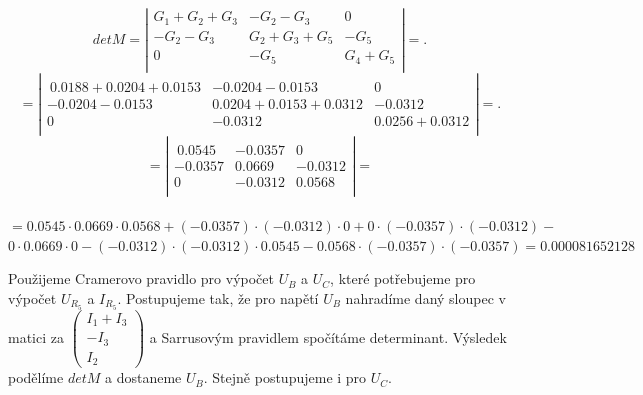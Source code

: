 \documentclass[10pt,a4paper]{article}
\begin{document}
  \begin{center}
   \begin{large}
\[det M = \left| 
  \begin{array}{ccc}
    G_1 + G_2 + G_3 & -G_2 -G_3 & 0 \\
    -G_2 - G_3 & G_2 + G_3 + G_5 & -G_5 \\
    0 & -G_5 &G_4 +G_5 \\
  \end{array}  \right|=.\]  
 \[ = \left| 
  \begin{array}{ccc}
   \\\
    0.0188+ 0.0204+ 0.0153 & -0.0204 -0.0153 & 0 \\
   -0.0204 - 0.0153 & 0.0204 + 0.0153 + 0.0312 & -0.0312 \\
   0 & -0.0312 &0.0256 +0.0312 \\
  \end{array}  \right|=.\]
  \[ = \left| 
  \begin{array}{ccc}
   \\\
    0.0545& -0.0357& 0 \\
   -0.0357& 0.0669 & -0.0312 \\
   0 & -0.0312 &0.0568 \\
  \end{array}  \right|=\]
   \\[6pt]
   $= 0.0545 \cdot 0.0669 \cdot 0.0568 + (-0.0357) \cdot (-0.0312) \cdot 0+ 0\cdot (-0.0357) \cdot (-0.0312) -$ \\ $0\cdot 0.0669 \cdot 0 -(-0.0312)\cdot (-0.0312) \cdot 0.0545 - 0.0568\cdot (-0.0357)\cdot (-0.0357)= 0.000081652128 $
  \\[20pt]      
   \end{large}
  \end{center}  
 
   \begin{large}
    \begin{flushleft}
     Použijeme Cramerovo pravidlo pro výpočet $U_B$ a $U_C$, které potřebujeme pro výpočet $U_{R_5}$ a $I_{R_5}$. Postupujeme tak, že pro napětí $U_B$ nahradíme daný sloupec v matici za $\begin{pmatrix} I_1 +I_3 \\ -I_3 \\ I_2 \end{pmatrix}$ a Sarrusovým pravidlem spočítáme determinant. Výsledek podělíme $det M$ a dostaneme $U_B$. Stejně postupujeme i pro $U_C$.
    \\[20pt]
    \end{flushleft}
    \end{large}      
  
\end{document}
